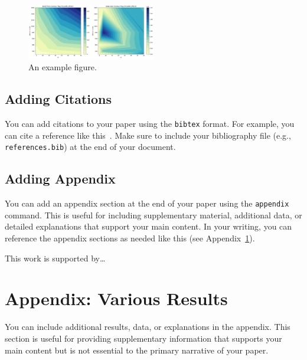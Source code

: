 \documentclass[
hf,
]{confart}
\begin{document}
\begin{figure}[htbp]
    \centering
    \includegraphics[width=0.5\textwidth]{assets/example.png}
    \caption{An example figure.}
    \label{fig:example}
\end{figure}

\subsection{Adding Citations}
You can add citations to your paper using the \texttt{bibtex} format. For example, you can cite a reference like this~\cite{guttman1984rtrees}. Make sure to include your bibliography file (e.g., \texttt{references.bib}) at the end of your document.


\subsection{Adding Appendix}
You can add an appendix section at the end of your paper using the \texttt{appendix} command. This is useful for including supplementary material, additional data, or detailed explanations that support your main content. In your writing, you can reference the appendix sections as needed like this (see Appendix~\ref{sec:appendix}).

\begin{acknowledgments}
    This work is supported by\ldots
\end{acknowledgments}



\appendix
\section{Appendix: Various Results}
\label{sec:appendix}
You can include additional results, data, or explanations in the appendix. This section is useful for providing supplementary information that supports your main content but is not essential to the primary narrative of your paper.
\end{document}
